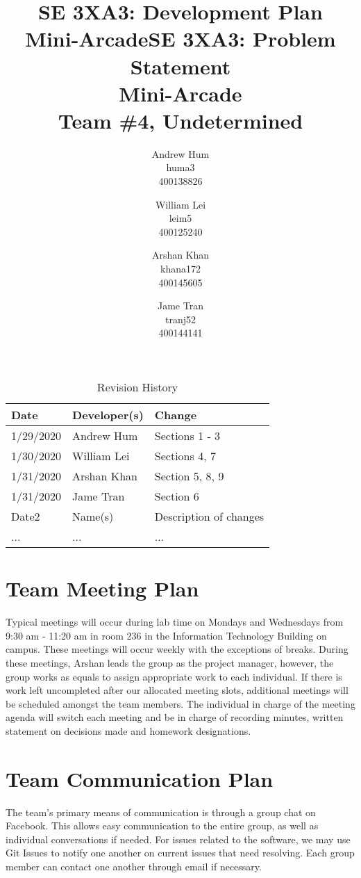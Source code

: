 \documentclass{article}
\title{SE 3XA3: Development Plan\\Mini-Arcade}
\title{SE 3XA3: Problem Statement \\ Mini-Arcade \\{\large Team \#4, Undetermined}}
\author{Andrew Hum \\ huma3 \\ 400138826 \and
		William Lei \\ leim5 \\ 400125240 \and
		Arshan Khan \\ khana172 \\ 400145605 \and
		Jame Tran \\ tranj52 \\ 400144141
}
\date{}
\begin{document}
\begin{table}[hp]
\caption{Revision History} \label{TblRevisionHistory}
\begin{tabularx}{\textwidth}{llX}
\toprule
\textbf{Date} & \textbf{Developer(s)} & \textbf{Change}\\
\midrule
1/29/2020 & Andrew Hum & Sections 1 - 3\\
1/30/2020 & William Lei & Sections 4, 7\\
1/31/2020 & Arshan Khan & Section 5, 8, 9 \\
1/31/2020 & Jame Tran & Section 6 \\
Date2 & Name(s) & Description of changes\\
... & ... & ...\\
\bottomrule
\end{tabularx}
\end{table}

\newpage

\maketitle

\section{Team Meeting Plan}

Typical meetings will occur during lab time on Mondays and Wednesdays from 9:30 am - 11:20 am in room 236 in the Information Technology Building on campus. These meetings will occur weekly with the exceptions of breaks. During these meetings, Arshan leads the group as the project manager, however, the group works as equals to assign appropriate work to each individual. If there is work left uncompleted after our allocated meeting slots, additional meetings will be scheduled amongst the team members. The individual in charge of the meeting agenda will switch each meeting and be in charge of recording minutes, written statement on decisions made and homework designations.

\section{Team Communication Plan}

The team's primary means of communication is through a group chat on Facebook. This allows easy communication to the entire group, as well as individual conversations if needed. For issues related to the software, we may use Git Issues to notify one another on current issues that need resolving. Each group member can contact one another through email if necessary.
\end{document}
